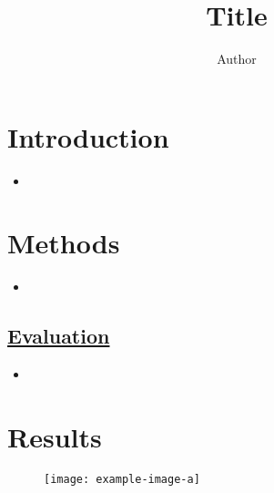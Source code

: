 \documentclass[portrait,color=UCLburgundy,margin=2cm]{uclposter}
\begin{document}
\title{Title}

\author[1 *]{Author}


\maketitle

\begin{multicols}{2}
\normalsize

\section*{Introduction}
    \begin{highlightbox}[UCLlightgreen]
        \begin{itemize}
            \item \blindtext
        \end{itemize}
    \end{highlightbox}

\section*{Methods}
    \begin{itemize}
        \subsection*{\underline{\textbf{Subsection}}}
            \item \blindtext
    \end{itemize}
    
    \subsection*{\underline{\textbf{Evaluation}}}
        \begin{highlightbox}[UCLlightgreen]
            \begin{itemize}
                \item \blindtext
            \end{itemize}
        \end{highlightbox}

\section*{Results}
    \begin{figure}[H]
        \centering
        \texttt{[image: example-image-a]}
        \begin{highlightbox}[UCLlightblue]
            \captionsetup{singlelinecheck=false, justification=centering}
            \caption{\blindtext}
        \end{highlightbox}
        \label{fig:com_graph}
    \end{figure}


\end{multicols}
\end{document}
